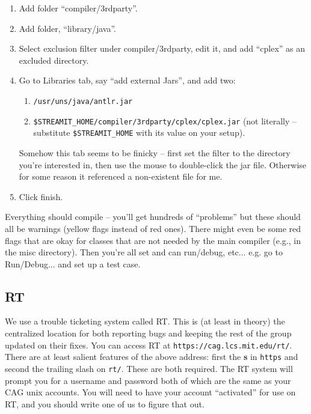\begin{enumerate}
\item Add folder ``compiler/3rdparty''.

\item Add folder, ``library/java''.

\item Select exclusion filter under compiler/3rdparty, edit it, and
add ``cplex'' as an excluded directory.

\item 

Go to Libraries tab, say ``add external Jars'', and add two:
\begin{enumerate}

\item {\tt /usr/uns/java/antlr.jar}

\item {\tt \$STREAMIT\_HOME/compiler/3rdparty/cplex/cplex.jar} (not
  literally -- substitute {\tt \$STREAMIT\_HOME} with its value on
  your setup).

\end{enumerate}
Somehow this tab seems to be finicky -- first set the filter to the
directory you're interested in, then use the mouse to double-click the
jar file.  Otherwise for some reason it referenced a non-existent file
for me.

\item Click finish.

\end{enumerate}

Everything should compile -- you'll get hundreds of ``problems'' but
these should all be warnings (yellow flags instead of red ones).
There might even be some red flags that are okay for classes that are
not needed by the main compiler (e.g., in the misc directory).  Then
you're all set and can run/debug, etc... e.g. go to Run/Debug... and
set up a test case.

\subsection{RT}
We use a trouble ticketing system called RT. This is (at least
in theory) the centralized location for both reporting bugs and 
keeping the rest of the group updated on their fixes.
You can access RT at {\tt https://cag.lcs.mit.edu/rt/}. There are at least
salient features of the above address: first the {\bf s} in {\tt https}
and second the trailing slash on {\tt rt/}. These are both
required. The RT system will prompt you for a username and password
both of which are the same as your CAG unix accounts. 
You will need to have your account ``activated'' for use on 
RT, and you should write one of us to figure that out.

